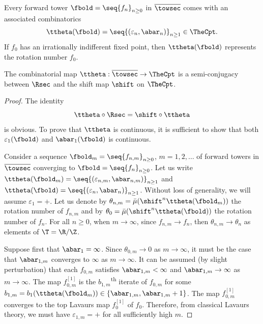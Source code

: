 \documentclass{amsart}
\begin{document}
Every forward tower $\fbold = \seq{f_n}_{n\geq 0}$ in $\overline{\towsec}$ comes with an associated combinatorics 
\[
    \ttheta(\fbold) = \seq{ (\varepsilon_n, \abar_n)}_{n\geq 1} \in \TheCpt.
\]
If $f_0$ has an irrationally indifferent fixed point, then $\ttheta(\fbold)$ represents the rotation number $f_0$.

\begin{proposition}
\label{prop:continuity-of-combinatorics}
    The combinatorial map 
    $\ttheta: \overline{\towsec} \to \TheCpt$
    is a semi-conjugacy between $\Rsec$ and the shift map $\shift$ on $\TheCpt$.
\end{proposition}

\begin{proof}
    The identity 
    \[
    \ttheta \circ \Rsec = \shift \circ \ttheta
    \]
    is obvious.
    To prove that $\ttheta$ is continuous, it is sufficient to show that both $\varepsilon_1(\fbold)$ and $\abar_1(\fbold)$ is continuous.
    
    Consider a sequence $\fbold_m = \seq{f_{n,m}}_{n\geq 0}$, $m = 1, 2,\ldots$ of forward towers in $\overline{\towsec}$ converging to $\fbold = \seq{f_n}_{n\geq 0}$.
    Let us write $\ttheta(\fbold_m) = \seq{(\varepsilon_{n,m},\abar_{n,m})}_{n \geq 1}$ and $\ttheta(\fbold) = \seq{(\varepsilon_n, \abar_n)}_{n \geq 1}$.
    Without loss of generality, we will assume $\varepsilon_1 = +$.
    Let us denote by $\theta_{n,m} = \bar{\mu}(\shift^n\ttheta(\fbold_m))$ the rotation number of $f_{n,m}$ and by $\theta_0 = \bar{\mu}(\shift^n\ttheta(\fbold))$ the rotation number of $f_n$.
    For all $n \geq 0$, when $m \to \infty$, since $f_{n,m} \to f_n$, then $\theta_{n,m} \to \theta_n$ as elements of $\T = \R/\Z$.
    
    Suppose first that $\abar_1 = \infty$.
    Since $\theta_{0,m} \to 0$ as $m \to \infty$, it must be the case that $\abar_{1,m}$ converges to $\infty$ as $m \to \infty$.
    It can be assumed (by slight perturbation) that each $f_{0,m}$ satisfies $\abar_{1,m} < \infty$ and $\abar_{1,m} \to \infty$ as $m \to \infty$.
    The map $f_{0,m}^{[1]}$ is the $b_{1,m}$\textsuperscript{th} iterate of $f_{0,m}$ for some $b_{1,m}=b_1(\ttheta(\fbold_m)) \in \{\abar_{1,m}, \abar_{1,m}+1\}$.
    The map $f_{0,m}^{[1]}$ converges to the top Lavaurs map $f_0^{[1]}$ of $f_0$.
    Therefore, from classical Lavaurs theory, we must have $\varepsilon_{1,m} = +$ for all sufficiently high $m$.


\end{proof}
\end{document}
